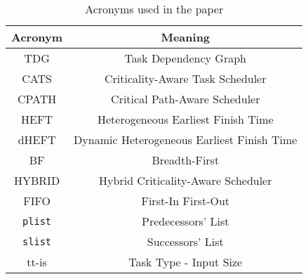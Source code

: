  

\begin{table}
\begin{center}
\caption{Acronyms used in the paper}
\label{tab.acronyms}
\begin{tabular}{|c|c|}
\hline
 \textbf{Acronym} & \textbf{Meaning}\\\hline\hline
TDG & Task Dependency Graph \\
CATS & Criticality-Aware Task Scheduler\\
CPATH & Critical Path-Aware Scheduler\\
HEFT & Heterogeneous Earliest Finish Time\\
dHEFT & Dynamic Heterogeneous Earliest Finish Time\\
BF & Breadth-First\\
HYBRID & Hybrid Criticality-Aware Scheduler\\
FIFO & First-In First-Out\\
\texttt{plist} & Predecessors' List\\
\texttt{slist} & Successors' List\\
tt-is & Task Type - Input Size\\
\hline
\end{tabular} 
\end{center}
\vspace{-0.4cm}
\end{table}